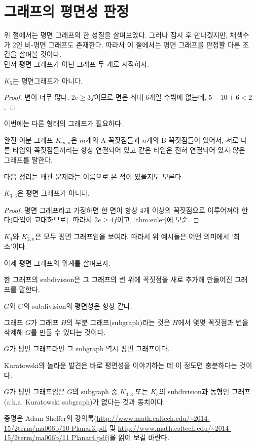 \section{그래프의 평면성 판정}
위 절에서는 평면 그래프의 한 성질을 살펴보았다. 그러나 잠시 후 만나겠지만, 채색수가 2인 비-평면 그래프도 존재한다. 따라서 이 절에서는 평면 그래프를 판정할 다른 조건을 살펴볼 것이다. \\
먼저 평면 그래프가 아닌 그래프 두 개로 시작하자. 
\begin{theorem}
    $K_5$는 평면그래프가 아니다.
\end{theorem}
\begin{proof}
    변이 너무 많다. $2e\geq 3f$이므로 면은 최대 6개일 수밖에 없는데, $5-10+6<2$. 
\end{proof}
이번에는 다른 형태의 그래프가 필요하다. 
\begin{definition}
    완전 이분 그래프 $K_{m, n}$은 $m$개의 A-꼭짓점들과 $n$개의 B-꼭짓점들이 있어서, 서로 다른 타입의 꼭짓점들끼리는 항상 연결되어 있고 같은 타입은 전혀 연결되어 있지 않은 그래프를 말한다. 
\end{definition}
다음 정리는 배관 문제라는 이름으로 본 적이 있을지도 모른다. 
\begin{theorem}
    $K_{3, 3}$은 평면 그래프가 아니다. 
\end{theorem}
\begin{proof}
    평면 그래프라고 가정하면 한 면이 항상 4개 이상의 꼭짓점으로 이루어져야 한다(타입이 교대하므로). 따라서 $2e\geq 4f$이고, \cref{thm:euler}에 모순.
\end{proof}
\begin{exercise}
    $K_4$와 $K_{2, n}$은 모두 평면 그래프임을 보여라. 따라서 위 예시들은 어떤 의미에서 `최소'이다. 
\end{exercise}
이제 평면 그래프의 위계를 살펴보자. 
\begin{definition}
    한 그래프의 subdivision은 그 그래프의 변 위에 꼭짓점을 새로 추가해 만들어진 그래프를 말한다. 
\end{definition}
\begin{remark}
    $G$와 $G$의 subdivision의 평면성은 항상 같다. 
\end{remark}
\begin{definition}
    그래프 $G$가 그래프 $H$의 부분 그래프(subgraph)라는 것은 $H$에서 몇몇 꼭짓점과 변을 삭제해 $G$를 만들 수 있다는 것이다. 
\end{definition}
\begin{remark}
    $G$가 평면 그래프라면 그 subgraph 역시 평면 그래프이다. 
\end{remark}
Kuratowski의 놀라운 발견은 바로 평면성을 이야기하는 데 이 정도면 충분하다는 것이다. 
\begin{theorem}[Kuratowski]\label{thm:kuratowski}
    $G$가 평면 그래프임은 $G$의 subgraph 중 $K_{3, 3}$ 또는 $K_5$의 subdivision과 동형인 그래프(a.k.a. Kuratowski subgraph)가 없다는 것과 동치이다. 
\end{theorem} 
증명은 Adam Sheffer의 강의록(\url{http://www.math.caltech.edu/~2014-15/2term/ma006b/10 Planar3.pdf} 및 \url{http://www.math.caltech.edu/~2014-15/2term/ma006b/11 Planar4.pdf})을 읽어 보길 바란다.

